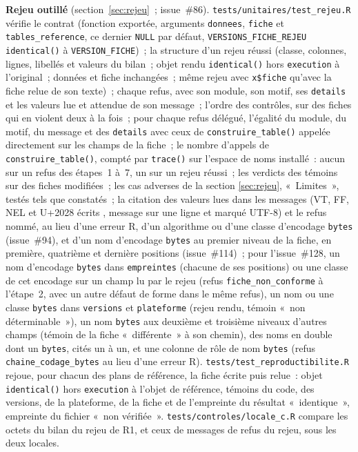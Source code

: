 \documentclass[a4paper,11pt]{article}
\newcommand{\code}[1]{\texttt{\small #1}}
\begin{document}
\medskip
{\sloppy \textbf{Rejeu outillé} (section~\ref{sec:rejeu}~; issue~\#86).
\code{tests/unitaires/test\_rejeu.R} vérifie le contrat (fonction
exportée, arguments \code{donnees}, \code{fiche} et
\code{tables\_reference}, ce dernier \code{NULL} par défaut,
\code{VERSIONS\_FICHE\_REJEU} \code{identical()} à \code{VERSION\_FICHE})~;
la structure d'un rejeu réussi (classe, colonnes, lignes, libellés et
valeurs du bilan~; objet rendu \code{identical()} hors \code{execution} à
l'original~; données et fiche inchangées~; même rejeu avec \code{x\$fiche}
qu'avec la fiche relue de son texte)~; chaque refus, avec son module, son
motif, ses \code{details} et les valeurs lue et attendue de son message~;
l'ordre des contrôles, sur des fiches qui en violent deux à la fois~; pour
chaque refus délégué, l'égalité du module, du motif, du message et des
\code{details} avec ceux de \code{construire\_table()} appelée directement
sur les champs de la fiche~; le nombre d'appels de
\code{construire\_table()}, compté par \code{trace()} sur l'espace de noms
installé~: aucun sur un refus des étapes~1 à~7, un sur un rejeu réussi~; les verdicts des
témoins sur des fiches modifiées~; les cas adverses de la section
\ref{sec:rejeu}, «~Limites~», testés tels que constatés~; la citation
des valeurs lues dans les messages (VT, FF, NEL et U+2028 écrits
\code{<U+XXXX>}, message sur une ligne et marqué UTF-8) et le refus nommé,
au lieu d'une erreur R, d'un algorithme ou d'une classe d'encodage
\code{bytes} (issue~\#94), et d'un nom d'encodage \code{bytes} au
premier niveau de la fiche, en première, quatrième et dernière positions
(issue~\#114)~; pour l'issue~\#128, un nom d'encodage \code{bytes} dans
\code{empreintes} (chacune de ses positions) ou une classe de cet encodage
sur un champ lu par le rejeu (refus \code{fiche\_non\_conforme} à
l'étape~2, avec un autre défaut de forme dans le même refus), un nom ou
une classe \code{bytes} dans \code{versions} et \code{plateforme} (rejeu
rendu, témoin «~non déterminable~»), un nom \code{bytes} aux deuxième et
troisième niveaux d'autres champs (témoin de la fiche «~différente~» à son
chemin), des noms en double dont un \code{bytes}, cités un à un, et une
colonne de rôle de nom \code{bytes} (refus \code{chaine\_codage\_bytes}
au lieu d'une erreur R).
\code{tests/test\_reproductibilite.R} rejoue, pour chacun des plans de
référence, la fiche écrite puis relue~: objet \code{identical()} hors
\code{execution} à l'objet de référence, témoins du code, des versions, de
la plateforme, de la fiche et de l'empreinte du résultat «~identique~»,
empreinte du fichier «~non vérifiée~». \code{tests/controles/locale\_c.R}
compare les octets du bilan du rejeu de R1, et ceux de messages de refus
du rejeu, sous les deux locales.\par}
\end{document}
